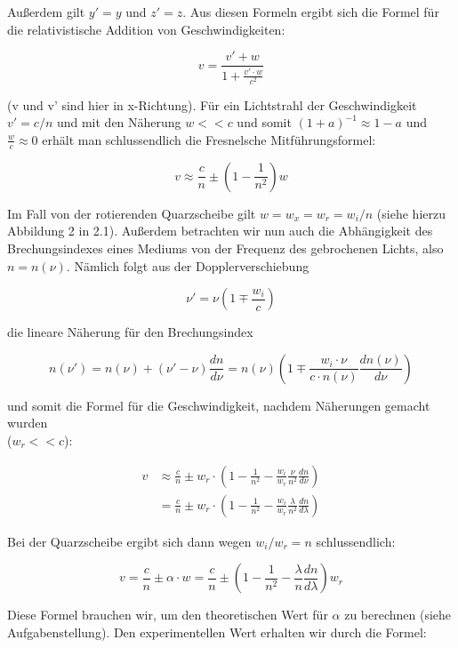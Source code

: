 Außerdem gilt $y'=y$ und $z'=z$. Aus diesen Formeln ergibt sich die Formel für die relati\-vistische Addition von Geschwindigkeiten:

\begin{equation} v = \frac{v' + w}{1 + \frac{v'\cdot w}{c^2}} \end{equation}

(v und v' sind hier in x-Richtung). Für ein Lichtstrahl der Geschwindigkeit $v' = c/n$ und mit den Näherung $w<<c$ und somit $(1+a)^{-1}\approx 1-a$ und $\frac{w}{c} \approx 0$ erhält man schlussendlich die Fresnelsche Mitführungsformel:

\begin{equation} v\approx \frac{c}{n} \pm \left(1-\frac{1}{n^2}\right)w \end{equation}

Im Fall von der rotierenden Quarzscheibe gilt $w = w_x = w_r = w_i / n$  (siehe hierzu Abbildung 2 in 2.1). Außerdem betrachten wir nun auch die Abhängigkeit des Brechungsindexes eines Mediums von der Frequenz des gebrochenen Lichts, also $n = n(\nu)$. Nämlich folgt aus der Dopplerverschiebung

$$\nu' = \nu\left( 1\mp \frac{w_i}{c}\right)$$

die lineare Näherung für den Brechungsindex

$$n(\nu') = n(\nu) + (\nu' - \nu)\frac{dn}{d\nu} = n(\nu)\left(1 \mp \frac{w_i\cdot\nu}{c\cdot n(\nu)}\frac{dn(\nu)}{d\nu} \right)$$

und somit die Formel für die Geschwindigkeit, nachdem Näherungen gemacht wurden \\ ($w_r << c$):

\begin{align} 
v & \approx \frac{c}{n} \pm w_r\cdot\left(1 - \frac{1}{n^2} - \frac{w_i}{w_r}\frac{\nu}{n^2}\frac{dn}{d\nu} \right)\\
& = \frac{c}{n} \pm w_r\cdot\left(1 - \frac{1}{n^2} - \frac{w_i}{w_r}\frac{\lambda}{n^2}\frac{dn}{d\lambda} \right)
\end{align}

Bei der Quarzscheibe ergibt sich dann wegen $w_i / w_r = n$ schlussendlich:

\begin{equation}
\boxed{v = \frac{c}{n} \pm \alpha\cdot w = \frac{c}{n} \pm \left(1 - \frac{1}{n^2} - \frac{\lambda}{n}\frac{dn}{d\lambda} \right)w_r}
\end{equation}

Diese Formel brauchen wir, um den theoretischen Wert für $\alpha$ zu berechnen (siehe Aufgabenstellung). Den experimentellen Wert erhalten wir durch die Formel:

